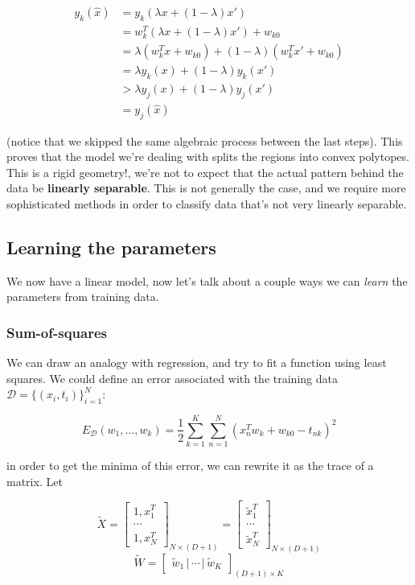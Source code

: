 \begin{align*}
 	y_k(\hat{x}) &= y_k(\lambda x + (1-\lambda)x')\\
 	&= w_k^T(\lambda x + (1-\lambda)x') + w_{k0}\\
 	&= \lambda(w_k^T x + w_{k0}) + (1-\lambda)(w_k^Tx' + w_{k0})\\
 	&= \lambda y_k(x) + (1-\lambda)y_k(x')\\
 	&> \lambda y_j(x) + (1-\lambda)y_j(x')\\
 	&= y_j(\hat{x})
 \end{align*}

(notice that we skipped the same algebraic process between the last steps). This proves that the model we're dealing with splits the regions into convex polytopes. This is a rigid geometry!, we're not to expect that the actual pattern behind the data be \textbf{linearly separable}. This is not generally the case, and we require more sophisticated methods in order to classify data that's not very linearly separable.

\subsection{Learning the parameters}

We now have a linear model, now let's talk about a couple ways we can \textit{learn} the parameters from training data.

\subsubsection{Sum-of-squares}

We can draw an analogy with regression, and try to fit a function using least squares. We could define an error associated with the training data $\mathcal{D} = \{(x_i, t_i)\}_{i=1}^N$:

\[E_\mathcal{D}(w_1,\dots,w_k) = \frac{1}{2}\sum_{k = 1}^K\sum_{n=1}^N(x_n^Tw_k + w_{k0} - t_{nk})^2\]

in order to get the minima of this error, we can rewrite it as the trace of a matrix. Let

\[\widetilde{X} = \begin{bmatrix}
	1, x_1^T\\
	\cdots\\
	1, x_N^T
\end{bmatrix}_{N\times(D+1)} = \begin{bmatrix}
	\widetilde{x}_1^T\\
	\cdots\\
	\widetilde{x}_N^T
\end{bmatrix}_{N\times(D+1)}\]
\[\widetilde{W} = \begin{bmatrix}
	\widetilde{w}_{1}\,|\,\cdots\,|\,\widetilde{w}_K
\end{bmatrix}_{(D+1)\times K}\]

